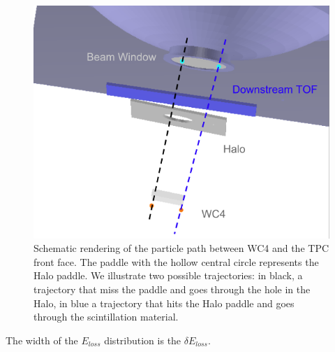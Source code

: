 \begin{figure}[hbpt]
\centering
\includegraphics[scale=0.5]{Chapter-9/Images/Halo.png}
\caption{Schematic rendering of the particle path between WC4 and the TPC front face. The paddle with the hollow central circle represents the Halo paddle. We illustrate two possible trajectories: in black, a trajectory that miss the paddle and goes through the hole in the Halo, in blue a trajectory that hits the Halo paddle and goes through the scintillation material.}
\label{fig:Halo}
\end{figure}


The width of the $E_{loss}$ distribution is the $\delta E_{loss}$.


